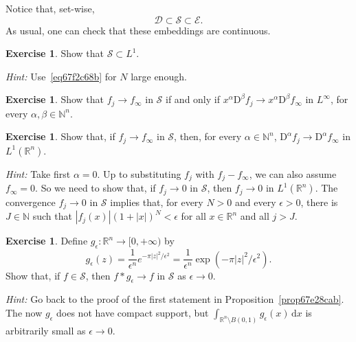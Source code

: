\documentclass[a4paper,9pt]{amsart}
\newcommand{\scr}[1]{\mathscr{#1}}
\newcommand{\N}{\mathbb{N}}	%
\newcommand{\R}{\mathbb{R}}	%
\newcommand{\did}{\,\mathrm{d}}	%
\newcommand{\Diff}{\mathrm{D}}
\theoremstyle{plain}
\theoremstyle{definition}
\newtheorem{exercise}[proposition]{Exercise}%
\theoremstyle{remark}
\begin{document}
Notice that, set-wise,
\begin{equation}
	\scr D \subset \scr S \subset \scr E .
\end{equation}
As usual, one can check that these embeddings are continuous.

\begin{exercise}
	Show that $\scr S\subset L^1$.
	
	{\it Hint:}
	Use~\eqref{eq67f2c68b} for $N$ large enough.
\end{exercise}

\begin{exercise}\label{ex68035dc9}
	Show that $f_j\to f_\infty$ in $\scr S$ if and only if $x^\alpha \Diff^\beta f_j \to x^\alpha \Diff^\beta f_\infty$ in $L^\infty$, for every $\alpha,\beta\in\N^n$.
\end{exercise}

\begin{exercise}
	Show that, if $f_j\to f_\infty$ in $\scr S$, then, for every $\alpha\in\N^n$, $\Diff^\alpha f_j\to\Diff^\alpha f_\infty$ in $L^1(\R^n)$.
	
	{\it Hint:}
	Take first $\alpha=0$. 
	Up to substituting $f_j$ with $f_j-f_\infty$, we can also assume $f_\infty=0$.
	So we need to show that, if $f_j\to0$ in $\scr S$, then $f_j\to 0$ in $L^1(\R^n)$.
	The convergence $f_j\to0$ in $\scr S$ implies that, for every $N>0$ and every $\epsilon>0$, there is $J\in\N$ such that $|f_j(x)| (1+|x|)^N < \epsilon$ for all $x\in\R^n$ and all $j>J$.
\end{exercise}

\begin{exercise}\label{ex67fc0379}%
	Define $g_\epsilon:\R^n\to[0,+\infty)$ by
	\begin{equation}
		g_\epsilon(z) = \frac1{\epsilon^n} e^{-\pi|z|^2/\epsilon^2} = \frac1{\epsilon^n}  \exp(-\pi|z|^2/\epsilon^2) .
	\end{equation}
	Show that, if $f\in\scr S$, then $f*g_\epsilon\to f$ in $\scr S$ as $\epsilon\to0$.
	
	{\it Hint:} Go back to the proof of the first statement in Proposition~\ref{prop67e28cab}.
	The now $g_\epsilon$ does not have compact support, but $\int_{\R^n\setminus B(0,1)} g_\epsilon(x)\did x$ is arbitrarily small as $\epsilon\to0$.
\end{exercise}%


\end{document}
